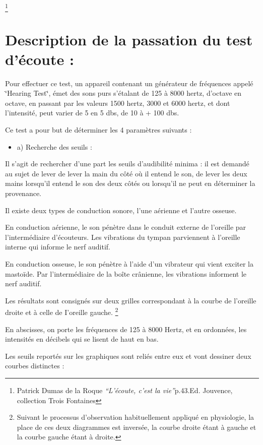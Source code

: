 \footnote{Patrick Dumas de la Roque \emph{``L'écoute, c'est la vie''}p.43.Ed.
Jouvence, collection Trois Fontaines}

\section{Description de la passation du test d'écoute :}

Pour effectuer ce test, un appareil contenant un générateur de fréquences
appelé \char`\"{}Hearing Test\char`\"{}, émet des sons purs s'étalant
de 125 à 8000 hertz, d'octave en octave, en passant par les valeurs
1500 hertz, 3000 et 6000 hertz, et dont l'intensité, peut varier de
5 en 5 dbs, de 10 à + 100 dbs. 

Ce test a pour but de déterminer les 4 paramètres suivants : 
\begin{itemize}
\item a) Recherche des seuils :
\end{itemize}
Il s'agit de rechercher d'une part les seuils d\textquoteright audibilité
minima : il est demandé au sujet de lever de lever la main du côté
où il entend le son, de lever les deux mains lorsqu'il entend le son
des deux côtés ou lorsqu'il ne peut en déterminer la provenance.

Il existe deux types de conduction sonore, l'une aérienne et l'autre
osseuse.

En conduction aérienne, le son pénètre dans le conduit externe de
l'oreille par l'intermédiaire d'écouteurs. Les vibrations du tympan
parviennent à l'oreille interne qui informe le nerf auditif.

En conduction osseuse, le son pénètre à l\textquoteright aide d'un
vibrateur qui vient exciter la mastoïde. Par l'intermédiaire de la
boîte crânienne, les vibrations informent le nerf auditif.

Les résultats sont consignés sur deux grilles correspondant à la courbe
de l'oreille droite et à celle de I\textquoteright oreille gauche.
\footnote{Suivant le processus d'observation habituellement appliqué en physiologie,
la place de ces deux diagrammes est inversée, la courbe droite étant
à gauche et la courbe gauche étant à droite. }

En abscisses, on porte les fréquences de 125 à 8000 Hertz, et en ordonnées,
les intensités en décibels qui se lisent de haut en bas. 

Les seuils reportés sur les graphiques sont reliés entre eux et vont
dessiner deux courbes distinctes : 

